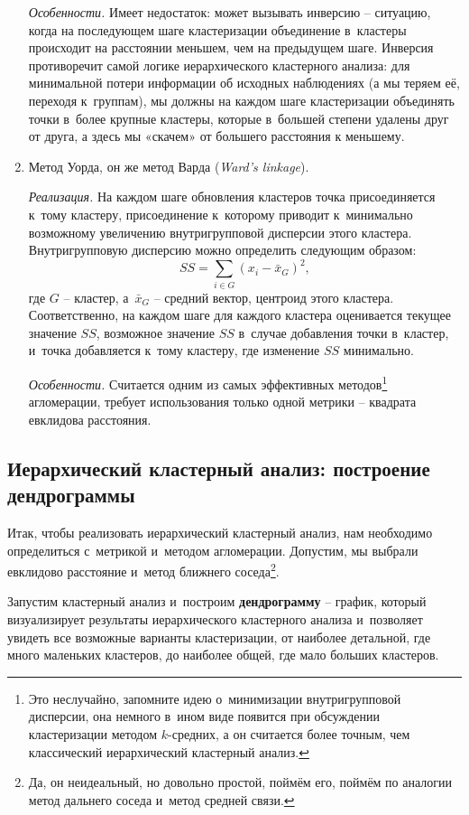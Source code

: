 \documentclass[12pt,a4paper]{article}
\theoremstyle{definition}
\begin{document}
\begin{enumerate}
\textit{Особенности.} Имеет недостаток: может вызывать инверсию – ситуацию, 
когда на последующем шаге кластеризации объединение в~кластеры происходит на 
расстоянии меньшем, чем на предыдущем шаге. Инверсия противоречит самой логике иерархического 
кластерного анализа: для минимальной потери информации об исходных наблюдениях (а мы теряем её, 
переходя к~группам), мы должны на каждом шаге кластеризации объединять 
точки в~более крупные кластеры, которые в~большей степени удалены друг от друга, 
а здесь мы «скачем» от большего расстояния к меньшему.
\item Метод Уорда, он же метод Варда (\textit{Ward's linkage}).

\textit{Реализация.} На каждом шаге обновления кластеров точка присоединяется к~тому кластеру, 
присоединение к~которому приводит к~минимально возможному увеличению внутригрупповой 
дисперсии этого кластера. Внутригрупповую дисперсию можно определить следующим 
образом:
$$
SS = \sum_{i\in G}(x_{i} - \bar{x}_{G})^2,
$$
где $G$ – кластер, а~$\bar{x}_{G}$ – средний вектор, центроид этого кластера.
Соответственно, на каждом шаге для каждого кластера оценивается 
текущее значение $SS$, возможное значение $SS$ в~случае добавления 
точки в~кластер, и~точка добавляется к~тому кластеру, где изменение $SS$ минимально.

\textit{Особенности.} Считается одним из самых эффективных методов\footnote{Это неслучайно, 
запомните идею о~минимизации внутригрупповой дисперсии, она немного в~ином виде 
появится при обсуждении кластеризации методом $k$-средних, а он считается более точным, 
чем классический иерархический кластерный анализ.} агломерации, требует 
использования только одной метрики – квадрата евклидова расстояния.
\end{enumerate}

\subsection{Иерархический кластерный анализ: построение дендрограммы}

Итак, чтобы реализовать иерархический кластерный анализ, нам необходимо 
определиться с~метрикой и~методом агломерации. Допустим, мы выбрали евклидово расстояние 
и~метод ближнего соседа\footnote{Да, он неидеальный, но довольно простой, поймём его, поймём 
по аналогии метод дальнего соседа и~метод средней связи.}. 

Запустим кластерный анализ и~построим \textbf{дендрограмму} – график, который визуализирует 
результаты иерархического кластерного анализа и~позволяет увидеть все возможные варианты 
кластеризации, от наиболее детальной, где много маленьких кластеров,
до наиболее общей, где мало больших кластеров. 
\end{document}
